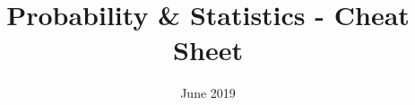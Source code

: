 \documentclass[9pt, landscape, a4paper]{article}
\title{\vspace{-4ex}\Large{Probability \& Statistics - Cheat Sheet}}
\date{June 2019}
\begin{document}
  \maketitle
  \begin{multicols}{2}
    \tableofcontents
  \end{multicols}

  \clearpage
  
\end{document}
